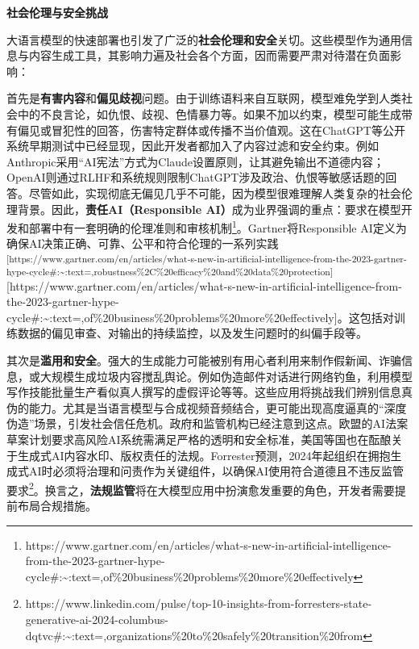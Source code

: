 \documentclass[
  letterpaper,
]{scrbook}
\begin{document}
\textbf{社会伦理与安全挑战}

大语言模型的快速部署也引发了广泛的\textbf{社会伦理和安全}关切。这些模型作为通用信息与内容生成工具，其影响力遍及社会各个方面，因而需要严肃对待潜在负面影响：

首先是\textbf{有害内容}和\textbf{偏见歧视}问题。由于训练语料来自互联网，模型难免学到人类社会中的不良言论，如仇恨、歧视、色情暴力等。如果不加以约束，模型可能生成带有偏见或冒犯性的回答，伤害特定群体或传播不当价值观。这在ChatGPT等公开系统早期测试中已经显现，因此开发者都加入了内容过滤和安全约束。例如Anthropic采用``AI宪法''方式为Claude设置原则，让其避免输出不道德内容；OpenAI则通过RLHF和系统规则限制ChatGPT涉及政治、仇恨等敏感话题的回答。尽管如此，实现彻底无偏见几乎不可能，因为模型很难理解人类复杂的社会伦理背景。因此，\textbf{责任AI（Responsible
AI）}成为业界强调的重点：要求在模型开发和部署中有一套明确的伦理准则和审核机制\footnote{https://www.gartner.com/en/articles/what-s-new-in-artificial-intelligence-from-the-2023-gartner-hype-cycle\#:\textasciitilde:text=,of\%20business\%20problems\%20more\%20effectively}。Gartner将Responsible
AI定义为确保AI决策正确、可靠、公平和符合伦理的一系列实践\textsuperscript{{[}https://www.gartner.com/en/articles/what-s-new-in-artificial-intelligence-from-the-2023-gartner-hype-cycle\#:\textasciitilde:text=,robustness\%2C\%20efficacy\%20and\%20data\%20protection{]}}{[}https://www.gartner.com/en/articles/what-s-new-in-artificial-intelligence-from-the-2023-gartner-hype-cycle\#:\textasciitilde:text=,of\%20business\%20problems\%20more\%20effectively{]}。这包括对训练数据的偏见审查、对输出的持续监控，以及发生问题时的纠偏手段等。

其次是\textbf{滥用和安全}。强大的生成能力可能被别有用心者利用来制作假新闻、诈骗信息，或大规模生成垃圾内容搅乱舆论。例如伪造邮件对话进行网络钓鱼，利用模型写作技能批量生产看似真人撰写的虚假评论等等。这些应用将挑战我们辨别信息真伪的能力。尤其是当语言模型与合成视频音频结合，更可能出现高度逼真的``深度伪造''场景，引发社会信任危机。政府和监管机构已经注意到这点。欧盟的AI法案草案计划要求高风险AI系统需满足严格的透明和安全标准，美国等国也在酝酿关于生成式AI内容水印、版权责任的法规。Forrester预测，2024年起组织在拥抱生成式AI时必须将治理和问责作为关键组件，以确保AI使用符合道德且不违反监管要求\footnote{https://www.linkedin.com/pulse/top-10-insights-from-forresters-state-generative-ai-2024-columbus-dqtvc\#:\textasciitilde:text=,organizations\%20to\%20safely\%20transition\%20from}。换言之，\textbf{法规监管}将在大模型应用中扮演愈发重要的角色，开发者需要提前布局合规措施。
\end{document}
